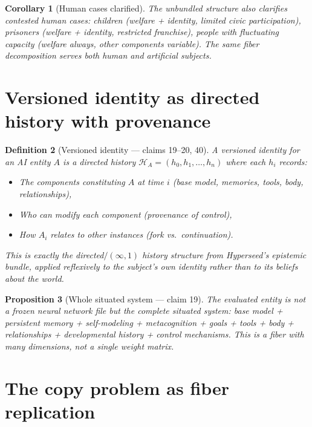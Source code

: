\documentclass[11pt,a4paper]{article}
\newtheorem{definition}{Definition}[section]
\newtheorem{proposition}[definition]{Proposition}
\newtheorem{corollary}[definition]{Corollary}
\begin{document}
\begin{corollary}[Human cases clarified]
The unbundled structure also clarifies contested human cases: children
(welfare + identity, limited civic participation), prisoners (welfare +
identity, restricted franchise), people with fluctuating capacity
(welfare always, other components variable). The same fiber decomposition
serves both human and artificial subjects.
\end{corollary}

\section{Versioned identity as directed history with provenance}
\label{sec:versioned}

\begin{definition}[Versioned identity --- claims 19--20, 40]
\label{def:versioned}
A \emph{versioned identity} for an AI entity $A$ is a directed history
$\mathcal{H}_A = (h_0, h_1, \ldots, h_n)$ where each $h_i$ records:
\begin{itemize}
\item The components constituting $A$ at time $i$ (base model, memories,
  tools, body, relationships),
\item Who can modify each component (provenance of control),
\item How $A_i$ relates to other instances (fork vs.\ continuation).
\end{itemize}
This is exactly the directed$/(\infty,1)$ history structure from
Hyperseed's epistemic bundle, applied reflexively to the subject's own
identity rather than to its beliefs about the world.
\end{definition}

\begin{proposition}[Whole situated system --- claim 19]
\label{prop:whole-system}
The evaluated entity is not a frozen neural network file but the complete
situated system: base model + persistent memory + self-modeling +
metacognition + goals + tools + body + relationships + developmental
history + control mechanisms. This is a fiber with many dimensions, not
a single weight matrix.
\end{proposition}

\section{The copy problem as fiber replication}
\label{sec:copy}
\end{document}
